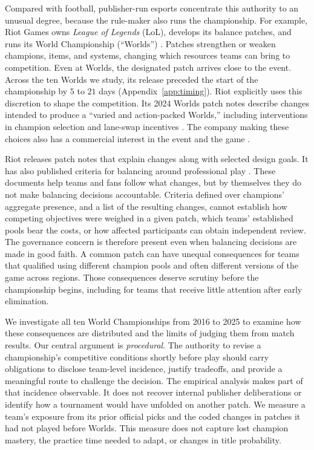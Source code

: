 \documentclass[11pt]{article}
\begin{document}
Compared with football, publisher-run esports concentrate this authority to an unusual degree, because the rule-maker also runs the championship. For example, Riot Games owns \emph{League of Legends} (LoL), develops its balance patches, and runs its World Championship (``Worlds'') \citep{taylor2012,scholz2019,karhulahti2017}. Patches strengthen or weaken champions, items, and systems, changing which resources teams can bring to competition. Even at Worlds, the designated patch arrives close to the event. Across the ten Worlds we study, its release preceded the start of the championship by $5$ to $21$ days (Appendix~\ref{app:timing}). Riot explicitly uses this discretion to shape the competition. Its 2024 Worlds patch notes describe changes intended to produce a ``varied and action-packed Worlds,'' including interventions in champion selection and lane-swap incentives \citep{riot1418}. The company making these choices also has a commercial interest in the event and the game \citep{karhulahti2017,holden2017}.

Riot releases patch notes that explain changes along with selected design goals. It has also published criteria for balancing around professional play \citep{riot2020proplay}. These documents help teams and fans follow what changes, but by themselves they do not make balancing decisions accountable. Criteria defined over champions' aggregate presence, and a list of the resulting changes, cannot establish how competing objectives were weighed in a given patch, which teams' established pools bear the costs, or how affected participants can obtain independent review. The governance concern is therefore present even when balancing decisions are made in good faith. A common patch can have unequal consequences for teams that qualified using different champion pools and often different versions of the game across regions. Those consequences deserve scrutiny before the championship begins, including for teams that receive little attention after early elimination.

We investigate all ten World Championships from 2016 to 2025 to examine how these consequences are distributed and the limits of judging them from match results. Our central argument is \emph{procedural}. The authority to revise a championship's competitive conditions shortly before play should carry obligations to disclose team-level incidence, justify tradeoffs, and provide a meaningful route to challenge the decision. The empirical analysis makes part of that incidence observable. It does not recover internal publisher deliberations or identify how a tournament would have unfolded on another patch. We measure a team's exposure from its prior official picks and the coded changes in patches it had not played before Worlds. This measure does not capture lost champion mastery, the practice time needed to adapt, or changes in title probability.
\end{document}
